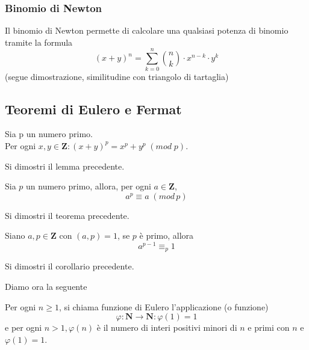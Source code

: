 \begin{flushleft}
\subsubsection{Binomio di Newton}
Il binomio di Newton permette di calcolare una qualsiasi potenza di binomio tramite la formula
\[(x+y)^n = \sum_{k=0}^n \binom{n}{k} \cdot x^{n-k}\cdot y^k\]
(segue dimostrazione, similitudine con triangolo di tartaglia)
\\ \vspace{300px}




\subsection{Teoremi di Eulero e Fermat}
\begin{lemma}
Sia p un numero primo.\\
Per ogni $x, y \in \mathbf{Z}: (x+y)^p = x^p + y^p\;(mod\;p)$.
\end{lemma}
\begin{esercizio}
Si dimostri il lemma precedente.
\end{esercizio}
\vspace{150px}

\begin{theorem}
Sia $p$ un numero primo, allora, per ogni $a\in \mathbf{Z}$,
\[a^p \equiv a\;(mod\,p)\]
\end{theorem}
\begin{esercizio}
Si dimostri il teorema precedente.
\end{esercizio}
\vspace{150px}


\begin{corollario}
Siano $a, p \in\mathbf{Z}$ con $(a, p) = 1$, se $p$ è primo, allora
\[a^{p-1} \equiv_p 1\]
\end{corollario}
\begin{esercizio}
Si dimostri il corollario precedente.
\end{esercizio}
\vspace{150px}
Diamo ora la seguente
\begin{definizione}
Per ogni $n\geq 1$, si chiama funzione di Eulero l'applicazione (o funzione)
\[\varphi: \mathbf{N} \to \mathbf{N}: \varphi(1) = 1\]
e per ogni $n>1, \varphi(n)$ è il numero di interi positivi minori di $n$ e primi con $n$ e $\varphi(1) = 1$.
\end{definizione}


\end{flushleft}

